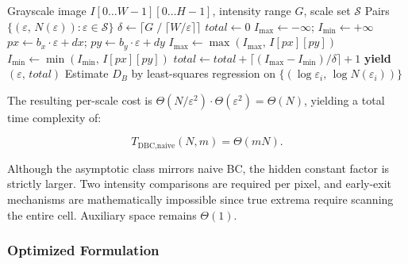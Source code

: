 \begin{algorithm}[t]
\caption{Naive Differential Box-Counting}
\label{alg:dbc_naive}
\begin{algorithmic}[1]
\Require Grayscale image $I[0\ldots W{-}1][0\ldots H{-}1]$, intensity range $G$, scale set $\mathcal{S}$
\Ensure Pairs $\{(\varepsilon,\, N(\varepsilon)) : \varepsilon \in \mathcal{S}\}$
  \State $\delta \leftarrow \lceil G \;/\; \lceil W/\varepsilon \rceil \rceil$
  \State $\mathit{total} \leftarrow 0$
      \State $I_{\max} \leftarrow -\infty$;\; $I_{\min} \leftarrow +\infty$
          \State $px \leftarrow b_x{\cdot}\varepsilon{+}dx$;\; $py \leftarrow b_y{\cdot}\varepsilon{+}dy$
            \State $I_{\max} \leftarrow \max(I_{\max},\, I[px][py])$
            \State $I_{\min} \leftarrow \min(I_{\min},\, I[px][py])$
          \EndIf
        \EndFor
      \EndFor
      \State $\mathit{total} \leftarrow \mathit{total} + \lceil (I_{\max}{-}I_{\min})/\delta \rceil + 1$
    \EndFor
  \EndFor
  \State \textbf{yield} $(\varepsilon,\, \mathit{total})$
\EndFor
\State Estimate $D_B$ by least-squares regression on $\{(\log \varepsilon_i,\, \log N(\varepsilon_i))\}$
\end{algorithmic}
\end{algorithm}

The resulting per-scale cost is $\Theta(N/\varepsilon^2) \cdot \Theta(\varepsilon^2) = \Theta(N)$, yielding a total time complexity of:

\begin{equation}
  T_{\text{DBC,naive}}(N, m) = \Theta(mN).
  \label{eq:dbc_naive_total}
\end{equation}

Although the asymptotic class mirrors naive BC, the hidden constant factor is strictly larger. Two intensity comparisons are required per pixel, and early-exit mechanisms are mathematically impossible since true extrema require scanning the entire cell. Auxiliary space remains $\Theta(1)$.

\subsubsection{Optimized Formulation}

